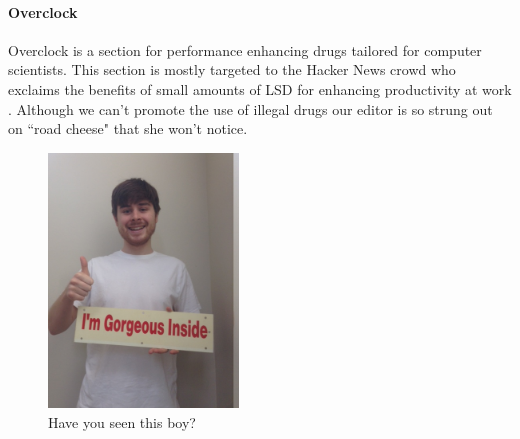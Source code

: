 \paragraph{Overclock}
Overclock is a section for performance enhancing drugs tailored for computer
scientists.
This section is mostly targeted to the Hacker News crowd who exclaims the
benefits of small amounts of LSD for enhancing productivity at work
.
Although we can't promote the use of illegal drugs our editor is so strung out
on ``road cheese" that she won't notice.

\begin{figure}
\centering
\includegraphics[width=0.45\textwidth]{figures/ad.jpg}
\caption{Have you seen this boy?}
\end{figure}
